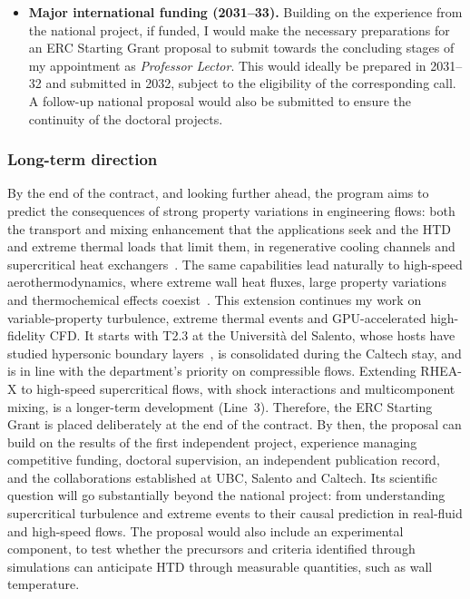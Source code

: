 \documentclass[11pt]{article}
\begin{document}
\begin{itemize}
  \item \textbf{Major international funding (2031--33).} Building on the experience from the national project, if funded, I would make the necessary preparations for an ERC Starting Grant proposal to submit towards the concluding stages of my appointment as \textit{Professor Lector}. This would ideally be prepared in 2031--32 and submitted in 2032, subject to the eligibility of the corresponding call. A follow-up national proposal would also be submitted to ensure the continuity of the doctoral projects.
\end{itemize}

\subsubsection{Long-term direction}

By the end of the contract, and looking further ahead, the program aims to predict the consequences of strong property variations in engineering flows: both the transport and mixing enhancement that the applications seek and the HTD and extreme thermal loads that limit them, in regenerative cooling channels and supercritical heat exchangers~\cite{Pizzarelli2018,Ahn2015}. 
The same capabilities lead naturally to high-speed aerothermodynamics, where extreme wall heat fluxes, large property variations and thermochemical effects coexist~\cite{Urzay2018,DiRenzoUrzay2021,Passiatore2022}. 
This extension continues my work on variable-property turbulence, extreme thermal events and GPU-accelerated high-fidelity CFD. 
It starts with T2.3 at the Universit\`a del Salento, whose hosts have studied hypersonic boundary layers~\cite{DiRenzoUrzay2021,Passiatore2022}, is consolidated during the Caltech stay, and is in line with the department's priority on compressible flows. 
Extending RHEA-X to high-speed supercritical flows, with shock interactions and multicomponent mixing, is a longer-term development (Line~3).
Therefore, the ERC Starting Grant is placed deliberately at the end of the contract. 
By then, the proposal can build on the results of the first independent project, experience managing competitive funding, doctoral supervision, an independent publication record, and the collaborations established at UBC, Salento and Caltech. 
Its scientific question will go substantially beyond the national project: from understanding supercritical turbulence and extreme events to their causal prediction in real-fluid and high-speed flows.
The proposal would also include an experimental component, to test whether the precursors and criteria identified through simulations can anticipate HTD through measurable quantities, such as wall temperature.
\end{document}
